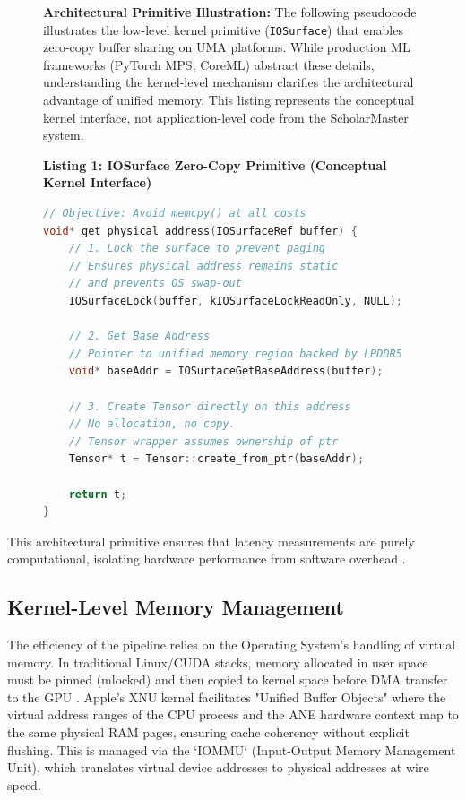 \documentclass[conference]{IEEEtran}
\begin{document}
\begin{figure}[htbp]
\vspace{0.2cm}
\textbf{Architectural Primitive Illustration:} The following pseudocode illustrates the low-level kernel primitive (\texttt{IOSurface}) that enables zero-copy buffer sharing on UMA platforms. While production ML frameworks (PyTorch MPS, CoreML) abstract these details, understanding the kernel-level mechanism clarifies the architectural advantage of unified memory. This listing represents the conceptual kernel interface, not application-level code from the ScholarMaster system.

\vspace{0.2cm}
\textbf{Listing 1: IOSurface Zero-Copy Primitive (Conceptual Kernel Interface)}
\begin{lstlisting}[language=C++]
// Objective: Avoid memcpy() at all costs
void* get_physical_address(IOSurfaceRef buffer) {
    // 1. Lock the surface to prevent paging
    // Ensures physical address remains static
    // and prevents OS swap-out
    IOSurfaceLock(buffer, kIOSurfaceLockReadOnly, NULL);
      
    // 2. Get Base Address 
    // Pointer to unified memory region backed by LPDDR5
    void* baseAddr = IOSurfaceGetBaseAddress(buffer);
      
    // 3. Create Tensor directly on this address
    // No allocation, no copy.
    // Tensor wrapper assumes ownership of ptr
    Tensor* t = Tensor::create_from_ptr(baseAddr);
      
    return t; 
}
\end{lstlisting}
\label{code:zerocopy}
\end{figure}

This architectural primitive ensures that latency measurements are purely computational, isolating hardware performance from software overhead \cite{b24}.

\subsection{Kernel-Level Memory Management}
The efficiency of the pipeline relies on the Operating System's handling of virtual memory. In traditional Linux/CUDA stacks, memory allocated in user space must be pinned (mlocked) and then copied to kernel space before DMA transfer to the GPU \cite{b29}. Apple's XNU kernel facilitates "Unified Buffer Objects" where the virtual address ranges of the CPU process and the ANE hardware context map to the same physical RAM pages, ensuring cache coherency without explicit flushing.  This is managed via the `IOMMU` (Input-Output Memory Management Unit), which translates virtual device addresses to physical addresses at wire speed.
\end{document}
